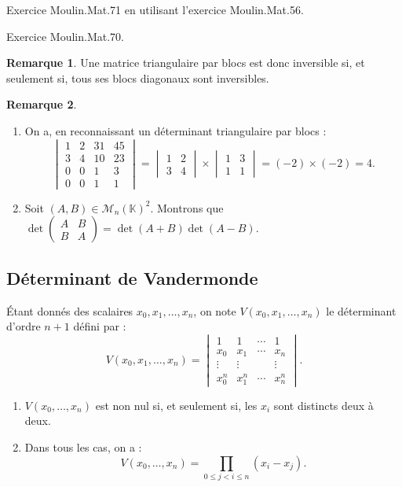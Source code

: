 \documentclass[french]{article}
\newcommand{\K}{\mathbb{K}}
\theoremstyle{plain}
\theoremstyle{definition}
\newtheorem*{rmq}{Remarque}
\theoremstyle{remark}
\begin{document}
Exercice Moulin.Mat.71 en utilisant l'exercice Moulin.Mat.56.

Exercice Moulin.Mat.70.

\begin{rmq}
	Une matrice triangulaire par blocs est donc inversible si, et seulement si, tous ses blocs diagonaux sont inversibles.
\end{rmq}

\begin{rmq}
	\begin{enumerate}
		\item On a, en reconnaissant un déterminant triangulaire par blocs :
		$$\begin{vmatrix}
			1&2&31&45\\
			3&4&10&23\\
			0&0&1&3\\
			0&0&1&1
		\end{vmatrix}=\begin{vmatrix}
		1&2\\
		3&4
		\end{vmatrix}\times\begin{vmatrix}
		1&3\\
		1&1
		\end{vmatrix}=(-2)\times(-2)=4.$$
		\item Soit $(A,B)\in\mathcal{M}_n(\K)^2$. Montrons que $\det\begin{pmatrix}
			A&B\\
			B&A
		\end{pmatrix}=\det(A+B)\det(A-B)$.
	\end{enumerate}
\end{rmq}

\subsection{Déterminant de Vandermonde}

\begin{prop}%
	Étant donnés des scalaires $x_0,x_1,\ldots,x_n$, on note $V(x_0,x_1,\ldots,x_n)$ le déterminant d'ordre $n+1$ défini par :
	$$V(x_0,x_1,\ldots,x_n)=\begin{vmatrix}
		1&1&\cdots&1\\
		x_0&x_1&\cdots&x_n\\
		\vdots&\vdots&&\vdots\\
		x_0^n&x_1^n&\cdots&x_n^n
	\end{vmatrix}.$$
	\begin{enumerate}
		\item $V(x_0,\ldots,x_n)$ est non nul si, et seulement si, les $x_i$ sont distincts deux à deux.
		\item Dans tous les cas, on a :
		$$V(x_0,\ldots,x_n)=\prod_{0\leqslant j<i\leqslant n}(x_i-x_j).$$
	\end{enumerate}
\end{prop}
\end{document}
